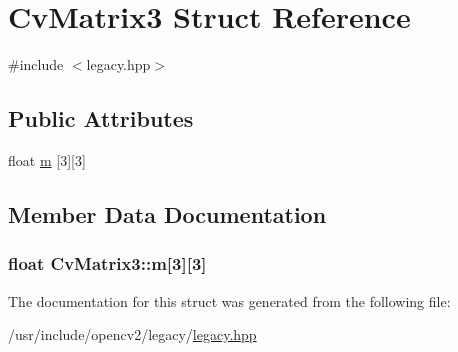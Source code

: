 \hypertarget{structCvMatrix3}{\section{Cv\-Matrix3 Struct Reference}
\label{structCvMatrix3}
}


{\ttfamily \#include $<$legacy.\-hpp$>$}

\subsection*{Public Attributes}
\begin{DoxyCompactItemize}
\item 
float \hyperlink{structCvMatrix3_a6c29129422d217bbddb7489cf1333c65}{m} \mbox{[}3\mbox{]}\mbox{[}3\mbox{]}
\end{DoxyCompactItemize}


\subsection{Member Data Documentation}
\hypertarget{structCvMatrix3_a6c29129422d217bbddb7489cf1333c65}{
\subsubsection[{m}]{\setlength{\rightskip}{0pt plus 5cm}float Cv\-Matrix3\-::m\mbox{[}3\mbox{]}\mbox{[}3\mbox{]}}}\label{structCvMatrix3_a6c29129422d217bbddb7489cf1333c65}


The documentation for this struct was generated from the following file\-:\begin{DoxyCompactItemize}
\item 
/usr/include/opencv2/legacy/\hyperlink{legacy_8hpp}{legacy.\-hpp}\end{DoxyCompactItemize}
